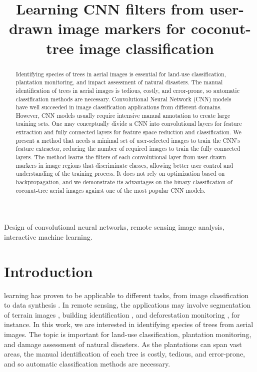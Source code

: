 
\title{Learning CNN filters from user-drawn image markers for coconut-tree image classification}

\maketitle

\begin{abstract}
Identifying species of trees in aerial images is essential for land-use classification, plantation monitoring, and impact assessment of natural disasters. The manual identification of trees in aerial images is tedious, costly, and error-prone, so automatic classification methods are necessary. Convolutional Neural Network (CNN) models have well succeeded in image classification applications from different domains. However, CNN models usually require intensive manual annotation to create large training sets. One may conceptually divide a CNN into convolutional layers for feature extraction and fully connected layers for feature space reduction and classification. We present a method that needs a minimal set of user-selected images to train the CNN's feature extractor, reducing the number of required images to train the fully connected layers. The method learns the filters of each convolutional layer from user-drawn markers in image regions that discriminate classes, allowing better user control and understanding of the training process. It does not rely on optimization based on backpropagation, and we demonstrate its advantages on the binary classification of coconut-tree aerial images against one of the most popular CNN models.
\end{abstract}

\begin{IEEEkeywords}
Design of convolutional neural networks, remote sensing image analysis, interactive machine learning.
\end{IEEEkeywords}

\section{Introduction}

 learning has proven to be applicable to different tasks, from image classification to data synthesis \cite{goodfellow2016deep}. In remote sensing, the applications may involve segmentation of terrain images \cite{kemker2018algorithms, kampffmeyer2016semantic}, building identification \cite{xu2018building, lu2018detecting, liu2018multilevel}, and deforestation monitoring \cite{bragilevsky2017deep}, for instance. In this work, we are interested in identifying species of trees from aerial images. The topic is important for land-use classification, plantation monitoring, and damage assessment of natural disasters. As the plantations can span vast areas, the manual identification of each tree is costly, tedious, and error-prone, and so automatic classification methods are necessary. 

